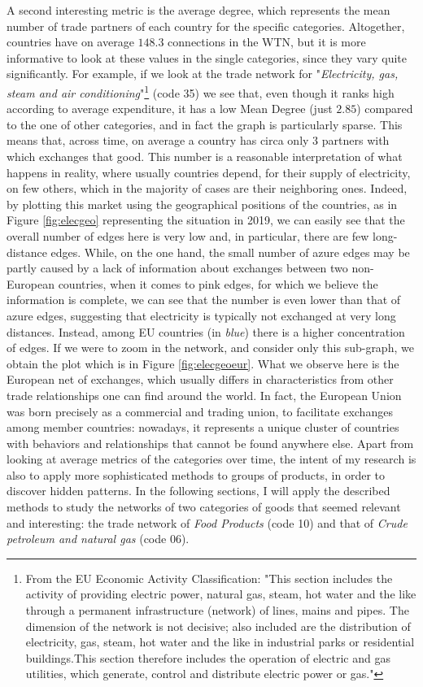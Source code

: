 A second interesting metric is the average degree, which represents the mean number of trade partners of each country for the specific categories. Altogether, countries have on average $148.3$ connections in the WTN, but it is more informative to look at these values in the single categories, since they vary quite significantly. For example, if we look at the trade network for "\textit{Electricity, gas, steam and air conditioning}"\footnote{
    From the EU Economic Activity Classification:
    "This section includes the activity of providing electric power, natural gas, steam, hot water and the like through a permanent infrastructure (network) of lines, mains and pipes. The dimension of the network is not decisive; also included are the distribution of electricity, gas, steam, hot water and the like in industrial parks or residential buildings.This section therefore includes the operation of electric and gas utilities, which generate, control and distribute electric power or gas."\cite{eurostat2022website}
} (code 35) we see that, even though it ranks high according to average expenditure, it has a low Mean Degree (just $2.85$) compared to the one of other categories, and in fact the graph is particularly sparse. This means that, across time, on average a country has circa only 3 partners with which exchanges that good. This number is a reasonable interpretation of what happens in reality, where usually countries depend, for their supply of electricity, on few others, which in the majority of cases are their neighboring ones. Indeed, by plotting this market using the geographical positions of the countries, as in Figure \ref{fig:elecgeo} representing the situation in 2019, we can easily see that the overall number of edges here is very low and, in particular, there are few long-distance edges. While, on the one hand, the small number of azure edges may be partly caused by a lack of information about exchanges between two non-European countries, when it comes to pink edges, for which we believe the information is complete, we can see that the number is even lower than that of azure edges, suggesting that electricity is typically not exchanged at very long distances. Instead, among EU countries (in \textit{blue}) there is a higher concentration of edges. If we were to zoom in the network, and consider only this sub-graph, we obtain the plot which is in Figure \ref{fig:elecgeoeur}. What we observe here is the European net of exchanges, which usually differs in characteristics from other trade relationships one can find around the world. In fact, the European Union was born precisely as a commercial and trading union, to facilitate exchanges among member countries: nowadays, it represents a unique cluster of countries with behaviors and relationships that cannot be found anywhere else.
Apart from looking at average metrics of the categories over time, the intent of my research is also to apply more sophisticated methods to groups of products, in order to discover hidden patterns. In the following sections, I will apply the described methods to study the networks of two categories of goods that seemed relevant and interesting: the trade network of \textit{Food Products} (code 10) and that of \textit{Crude petroleum and natural gas} (code 06).\pagebreak


